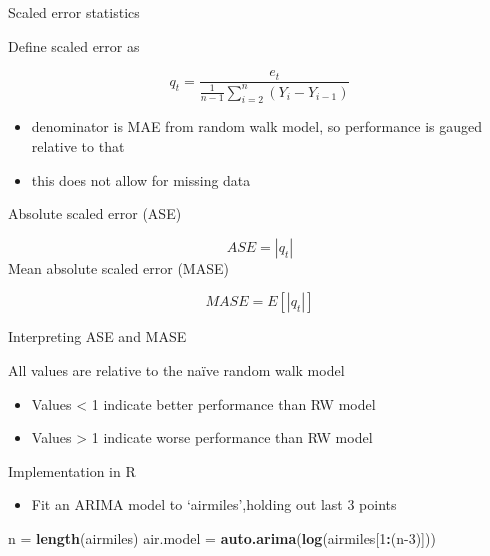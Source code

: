 \documentclass[ignorenonframetext,]{beamer}
\newenvironment{Shaded}{\begin{snugshade}}{\end{snugshade}}
\newcommand{\DecValTok}[1]{\textcolor[rgb]{0.00,0.00,0.81}{#1}}
\newcommand{\KeywordTok}[1]{\textcolor[rgb]{0.13,0.29,0.53}{\textbf{#1}}}
\newcommand{\NormalTok}[1]{#1}
\newcommand{\OperatorTok}[1]{\textcolor[rgb]{0.81,0.36,0.00}{\textbf{#1}}}
\newcommand{\StringTok}[1]{\textcolor[rgb]{0.31,0.60,0.02}{#1}}
\providecommand{\tightlist}{%
  \setlength{\itemsep}{0pt}\setlength{\parskip}{0pt}}
\begin{document}
\begin{frame}[fragile]
\begin{block}{Scaled error statistics}

Define scaled error as

\[{ q }_{ t }=\frac { { e }_{ t } }{ \frac { 1 }{ n-1 } \sum _{ i=2 }^{ n }{ \left( { Y }_{ i }-{ Y }_{ i-1 } \right)  }  }\]

\begin{itemize}
\tightlist
\item
  denominator is MAE from random walk model, so performance is gauged
  relative to that
\item
  this does not allow for missing data
\end{itemize}

Absolute scaled error (ASE)

\[ASE=\left| { q }_{ t } \right|\] Mean absolute scaled error (MASE)

\[MASE=E\left[ \left| { q }_{ t } \right|  \right]\]

\end{block}

\begin{block}{Interpreting ASE and MASE}

All values are relative to the naïve random walk model

\begin{itemize}
\item
  Values \textless{} 1 indicate better performance than RW model
\item
  Values \textgreater{} 1 indicate worse performance than RW model
\end{itemize}

\end{block}

\begin{block}{Implementation in R}

\begin{itemize}
\tightlist
\item
  Fit an ARIMA model to `airmiles',holding out last 3 points
\end{itemize}

\begin{Shaded}
\begin{Highlighting}[]
\NormalTok{n =}\StringTok{ }\KeywordTok{length}\NormalTok{(airmiles)}
\NormalTok{air.model =}\StringTok{ }\KeywordTok{auto.arima}\NormalTok{(}\KeywordTok{log}\NormalTok{(airmiles[}\DecValTok{1}\OperatorTok{:}\NormalTok{(n}\DecValTok{-3}\NormalTok{)]))}
\end{Highlighting}
\end{Shaded}


\end{block}
\end{frame}
\end{document}
